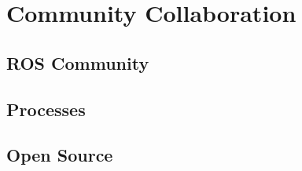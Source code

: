 \chapter{Community Collaboration}

\section{ROS Community}
\section{Processes}
\section{Open Source}

